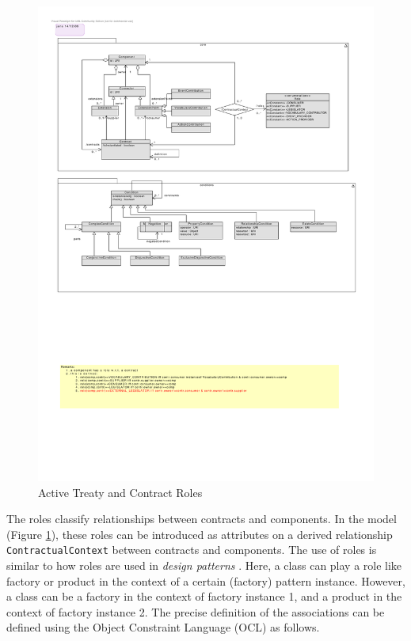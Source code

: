 \documentclass{llncs}
\begin{document}
\begin{figure}[t]
  \centering
  \includegraphics[width=1.0\textwidth]{RoleModel2.pdf}
  \caption{Active Treaty and Contract Roles}
  \label{fig:roles}
\end{figure}

The roles classify relationships between contracts and components. In the model (Figure \ref{fig:roles}), these roles can be introduced as attributes on a derived relationship \texttt{ContractualContext} between contracts and components. The use of roles is similar to how roles are used in \textit{design patterns} \cite{GangOf4} \cite{riehle:roleModels}. Here, a class can play a role like factory or product in the context of a certain (factory) pattern instance. However, a class can be a factory in the context of factory instance 1, and a product in the context of factory instance 2. The precise definition of the associations can be defined using the Object Constraint Language (OCL) \cite{OCL20} as follows. 
\end{document}

